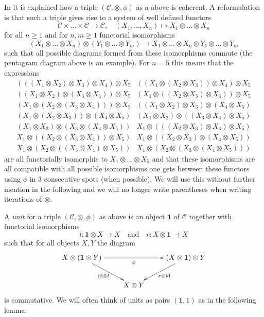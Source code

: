 \medskip\noindent
In \cite[Theorem 3.1]{associativity} it is explained how a triple
$(\mathcal{C}, \otimes, \phi)$ as a above is coherent. A reformulation
is that such a triple gives rise to a system of well defined functors
$$
\mathcal{C} \times \ldots \times \mathcal{C} \longrightarrow \mathcal{C},
\quad
(X_1, \ldots, X_n) \longmapsto X_1 \otimes \ldots \otimes X_n
$$
for all $n \geq 1$ and for $n, m \geq 1$ functorial isomorphisms
$$
(X_1 \otimes \ldots \otimes X_n) \otimes (Y_1 \otimes \ldots \otimes Y_m)
\to
X_1 \otimes \ldots \otimes X_n \otimes Y_1 \otimes \ldots \otimes Y_m
$$
such that all possible diagrams formed from these isomorphisms
commute (the pentagram diagram above is an example). For $n = 5$
this means that the expressions
$$
\begin{matrix}
(((X_1 \otimes X_2) \otimes X_3) \otimes X_4) \otimes X_5 &
((X_1 \otimes (X_2 \otimes X_3)) \otimes X_4) \otimes X_5 \\
((X_1 \otimes X_2) \otimes (X_3 \otimes X_4)) \otimes X_5 &
(X_1 \otimes ((X_2 \otimes X_3) \otimes X_4)) \otimes X_5 \\
(X_1 \otimes (X_2 \otimes (X_3 \otimes X_4))) \otimes X_5 &
((X_1 \otimes X_2) \otimes X_3) \otimes (X_4 \otimes X_5) \\
(X_1 \otimes (X_2 \otimes X_3)) \otimes (X_4 \otimes X_5) &
(X_1 \otimes X_2) \otimes ((X_3 \otimes X_4) \otimes X_5) \\
(X_1 \otimes X_2) \otimes (X_3 \otimes (X_4 \otimes X_5)) &
X_1 \otimes (((X_2 \otimes X_3) \otimes X_4) \otimes X_5) \\
X_1 \otimes ((X_2 \otimes (X_3 \otimes X_4)) \otimes X_5) &
X_1 \otimes ((X_2 \otimes X_3) \otimes (X_4 \otimes X_5)) \\
X_1 \otimes (X_2 \otimes ((X_3 \otimes X_4) \otimes X_5)) &
X_1 \otimes (X_2 \otimes (X_3 \otimes (X_4 \otimes X_5)))
\end{matrix}
$$
are all functorially isomorphic to $X_1 \otimes \ldots \otimes X_5$
and that these isomorphisms are all compatible with all possible
isomorphisms one gets between these functors using $\phi$ in
3 consecutive spots (when possible). We will use this without
further mention in the following and we will no longer write
parentheses when writing iterations of $\otimes$.

\medskip\noindent
A {\it unit} for a triple $(\mathcal{C}, \otimes, \phi)$ as above
is an object $\mathbf{1}$ of $\mathcal{C}$ together with functorial
isomorphisms
$$
l : \mathbf{1} \otimes X \to X
\quad\text{and}\quad
r : X \otimes \mathbf{1} \to X
$$
such that for all objects $X, Y$ the diagram
\begin{equation}
\label{equation-triangle}
\vcenter{
\xymatrix{
X \otimes (\mathbf{1} \otimes Y) \ar[rr]_\phi \ar[rd]_{\text{id} \otimes l} & &
(X \otimes \mathbf{1}) \otimes Y \ar[ld]^{r \otimes \text{id}} \\
& X \otimes Y
}
}
\end{equation}
is commutative. We will often think of units as pairs $(\mathbf{1}, 1)$
as in the following lemma.

